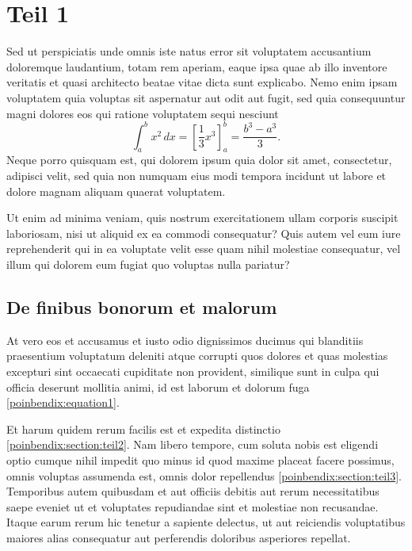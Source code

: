 %
%
%
%
\section{Teil 1
\label{poinbendix:section:teil1}}
Sed ut perspiciatis unde omnis iste natus error sit voluptatem
accusantium doloremque laudantium, totam rem aperiam, eaque ipsa
quae ab illo inventore veritatis et quasi architecto beatae vitae
dicta sunt explicabo.
Nemo enim ipsam voluptatem quia voluptas sit aspernatur aut odit
aut fugit, sed quia consequuntur magni dolores eos qui ratione
voluptatem sequi nesciunt
\begin{equation}
\int_a^b x^2\, dx
=
\left[ \frac13 x^3 \right]_a^b
=
\frac{b^3-a^3}3.
\label{poinbendix:equation1}
\end{equation}
Neque porro quisquam est, qui dolorem ipsum quia dolor sit amet,
consectetur, adipisci velit, sed quia non numquam eius modi tempora
incidunt ut labore et dolore magnam aliquam quaerat voluptatem.

Ut enim ad minima veniam, quis nostrum exercitationem ullam corporis
suscipit laboriosam, nisi ut aliquid ex ea commodi consequatur?
Quis autem vel eum iure reprehenderit qui in ea voluptate velit
esse quam nihil molestiae consequatur, vel illum qui dolorem eum
fugiat quo voluptas nulla pariatur?

\subsection{De finibus bonorum et malorum
\label{poinbendix:subsection:finibus}}
At vero eos et accusamus et iusto odio dignissimos ducimus qui
blanditiis praesentium voluptatum deleniti atque corrupti quos
dolores et quas molestias excepturi sint occaecati cupiditate non
provident, similique sunt in culpa qui officia deserunt mollitia
animi, id est laborum et dolorum fuga \eqref{poinbendix:equation1}.

Et harum quidem rerum facilis est et expedita distinctio
\ref{poinbendix:section:teil2}.
Nam libero tempore, cum soluta nobis est eligendi optio cumque nihil
impedit quo minus id quod maxime placeat facere possimus, omnis
voluptas assumenda est, omnis dolor repellendus
\ref{poinbendix:section:teil3}.
Temporibus autem quibusdam et aut officiis debitis aut rerum
necessitatibus saepe eveniet ut et voluptates repudiandae sint et
molestiae non recusandae.
Itaque earum rerum hic tenetur a sapiente delectus, ut aut reiciendis
voluptatibus maiores alias consequatur aut perferendis doloribus
asperiores repellat.


